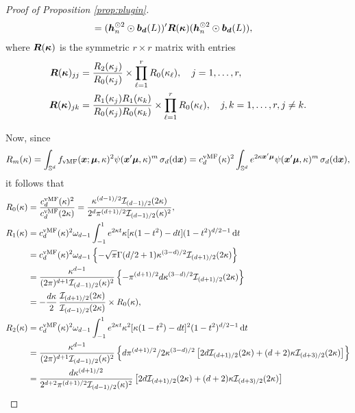\documentclass[oneside,11pt]{article}
\begin{document}
\begin{proof}[Proof of Proposition \ref{prop:plugin}]
\begin{align*}
    =&\;({\boldsymbol{h}}_n^{\odot 2}\odot\boldsymbol{b}_{\boldsymbol{d}}(L))'\boldsymbol{R}(\boldsymbol\kappa)({\boldsymbol{h}}_n^{\odot 2}\odot\boldsymbol{b}_{\boldsymbol{d}}(L)),
\end{align*}
where $\boldsymbol{R}(\boldsymbol\kappa)$ is the symmetric $r\times r$ matrix with entries
\begin{align}
    \boldsymbol{R}(\boldsymbol\kappa)_{jj}&=\frac{R_2(\kappa_j)}{R_0(\kappa_j)}\times\prod_{\ell=1}^{r} R_0(\kappa_\ell),\quad j=1,\ldots,r,\label{eq:rkk}\\
    \boldsymbol{R}(\boldsymbol\kappa)_{jk}&=\frac{R_1(\kappa_j) R_1(\kappa_k)}{R_0(\kappa_j) R_0(\kappa_k)}\times\prod_{\ell=1}^{r} R_0(\kappa_\ell),\quad j,k=1,\ldots,r,j\neq k\label{eq:rjk}.
\end{align}

Now, since
\begin{align*}
    R_m(\kappa)=\int_{\mathbb{S}^{d}} f_{\mathrm{vMF}}(\boldsymbol{x};\boldsymbol\mu,\kappa)^2 \psi(\boldsymbol{x}'\boldsymbol\mu,\kappa)^m\,\sigma_{d}(\mathrm{d}\boldsymbol{x})=c_d^{\mathrm{vMF}}(\kappa)^2\int_{\mathbb{S}^{d}} e^{2\kappa\boldsymbol{x}'\boldsymbol\mu}\psi(\boldsymbol{x}'\boldsymbol\mu,\kappa)^m\,\sigma_{d}(\mathrm{d}\boldsymbol{x}),
\end{align*}
it follows that
\begin{align}
    R_0(\kappa)&=\frac{c_d^{\mathrm{vMF}}(\kappa)^2}{c_d^{\mathrm{vMF}}(2\kappa)}%
    =\frac{\kappa^{(d-1)/2}\mathcal{I}_{(d-1)/2}(2\kappa)}{2^d \pi^{(d+1)/2}\mathcal{I}_{(d-1)/2}(\kappa)^2},\label{eq:R0}\\
%
%
    R_1(\kappa)%
    &=c_d^{\mathrm{vMF}}(\kappa)^2\omega_{d-1}\int_{-1}^1 e^{2\kappa t} \kappa[\kappa(1-t^2)-dt] (1-t^2)^{d/2-1}\,\rd t\nonumber\\
    &=c_d^{\mathrm{vMF}}(\kappa)^2\omega_{d-1}\lrb{-\sqrt{\pi}\Gamma(d/2+1) \kappa^{(3-d)/2} \mathcal{I}_{(d+1)/2}(2\kappa)}\nonumber\\
    &=\frac{\kappa^{d-1}}{(2\pi)^{d+1}\mathcal{I}_{(d-1)/2}(\kappa)^2} \lrb{-\pi^{(d+1)/2} d \kappa^{(3-d)/2} \mathcal{I}_{(d+1)/2}(2\kappa)}\nonumber\\
    &=-\frac{d\kappa}{2}\, \frac{\mathcal{I}_{(d+1)/2}(2\kappa)}{\mathcal{I}_{(d-1)/2}(2\kappa)} \times R_0(\kappa),\label{eq:R1}\\
%
%
    R_2(\kappa)%
    &=c_d^{\mathrm{vMF}}(\kappa)^2\omega_{d-1}\int_{-1}^1 e^{2\kappa t} \kappa^2[\kappa(1-t^2)-dt]^2 (1-t^2)^{d/2-1}\,\rd t\nonumber\\
    &=\frac{\kappa^{d-1}}{(2\pi)^{d+1}\mathcal{I}_{(d-1)/2}(\kappa)^2} \lrb{d\pi^{(d+1)/2}/2 \kappa^{(3-d)/2}\lrc{2d\mathcal{I}_{(d+1)/2}(2\kappa)+(d+2)\kappa \mathcal{I}_{(d+3)/2}(2\kappa)}}\nonumber\\
    &=\frac{d\kappa^{(d+1)/2}}{2^{d+2}\pi^{(d+1)/2}\mathcal{I}_{(d-1)/2}(\kappa)^2} \lrc{2d\mathcal{I}_{(d+1)/2}(2\kappa)+(d+2)\kappa \mathcal{I}_{(d+3)/2}(2\kappa)}\label{eq:connect}\\

\end{align}
\end{proof}
\end{document}
